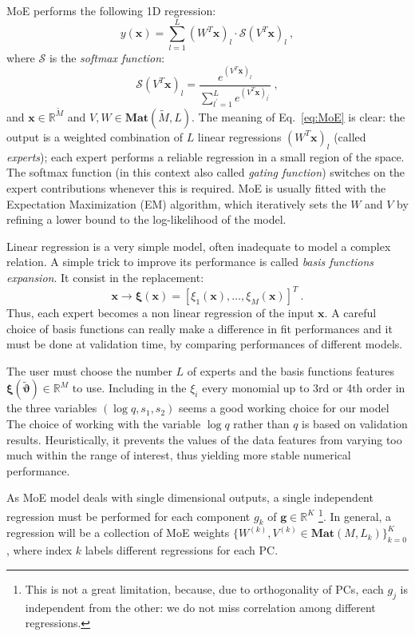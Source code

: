 \documentclass[twocolumn,showpacs,preprintnumbers,nofootinbib,prd,
superscriptaddress,10pt]{revtex4-1}
\newcommand{\R}{\mathbb{R}}
\begin{document}
MoE performs the following 1D regression:
\begin{equation} \label{eq:MoE}
	y(\mathbf{x}) = \sum_{l=1}^L (W^T \mathbf{x})_l \cdot \mathcal{S}(V^T\mathbf{x})_l \ ,
\end{equation}
where $\mathcal{S}$ is the \textit{softmax function}:
\begin{equation} \label{eq:softmax}
	\mathcal{S}(V^T{\mathbf{x}})_l = \frac{e^{(V^T{\mathbf{x}})_l}}{\sum_{l^\prime = 1}^L e^{(V^T{\mathbf{x}})_{l^\prime}}} \ ,
\end{equation}
and ${\mathbf{x}} \in \R^{\tilde{M}}$ and $V,W \in \mathbf{Mat}(\tilde{M},L)$.
The meaning of Eq.~\eqref{eq:MoE} is clear: the output is a weighted combination of $L$ linear regressions $(W^T \mathbf{x})_l$ (called \textit{experts}); each expert performs a reliable regression in a small region of the space. The softmax function (in this context also called \textit{gating function}) switches on the expert contributions whenever this is required.
MoE is usually fitted with the Expectation Maximization (EM) algorithm, which iteratively sets the $W$ and $V$ by refining a lower bound to the log-likelihood of the model.

Linear regression is a very simple model, often inadequate to model a complex relation. A simple trick to improve its performance is called \textit{basis functions expansion}. It consist in the replacement:
\begin{equation}
	{\mathbf{x}} \longrightarrow {\boldsymbol{\xi}}({\mathbf{x}}) = [\xi_1({\mathbf{x}}), \ldots, \xi_M({\mathbf{x}})]^T \ .
\end{equation}
Thus, each expert becomes a non linear regression of the input ${\mathbf{x}}$.
A careful choice of basis functions can really make a difference in fit performances 
and it must be done at validation time, by comparing performances of different models.

The user must choose the number $L$ of experts and the basis functions features ${\boldsymbol{\xi}}({\tilde{\boldsymbol{\vartheta}}}) \in \R^{M}$ to use.
Including in the $\xi_i$ every monomial up to 3rd or 4th order in the three variables $ (\log q, s_1, s_2)$ seems a good working choice for our model
The choice of working with the variable $\log q$ rather than $q$ is based on validation results.
Heuristically, it prevents the values of the data features from varying too much within the 
range of interest, thus yielding more stable numerical performance.

As MoE model deals with single dimensional outputs, a single independent regression must be performed for each component $g_k$ of $\mathbf{g} \in \R^K$
\footnote{This is not a great limitation, because, due to orthogonality of PCs, each $g_j$ is independent from the other: we do not miss correlation among different regressions.}.
In general, a regression will be a collection of MoE weights ${\{ W^{(k)}, V^{(k)} \in \mathbf{Mat}(M,L_k) \}_{k=0}^K}$, where index $k$ labels different regressions for each PC.
\end{document}
